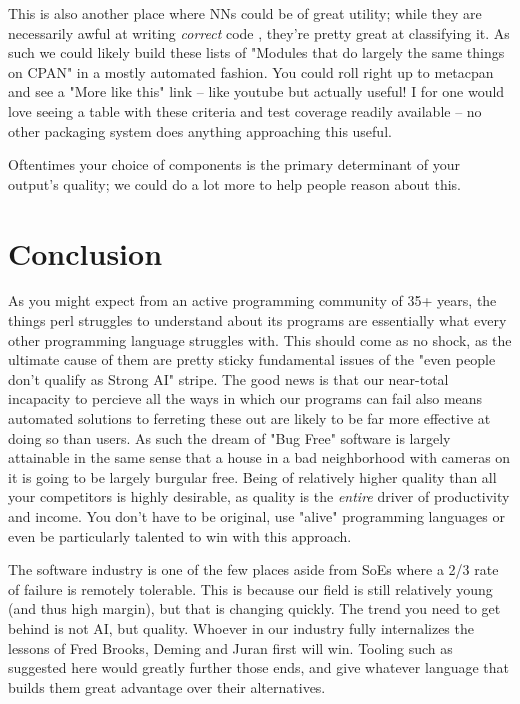 \documentclass{article}
\begin{document}
This is also another place where NNs could be of great utility; while they are necessarily awful at writing \textit{correct} code \cite{copilot}, they're pretty great at classifying it.
As such we could likely build these lists of "Modules that do largely the same things on CPAN" in a mostly automated fashion.
You could roll right up to metacpan and see a "More like this" link -- like youtube but actually useful!
I for one would love seeing a table with these criteria and test coverage readily available -- no other packaging system does anything approaching this useful.

Oftentimes your choice of components is the primary determinant of your output's quality; we could do a lot more to help people reason about this.

\newpage
\section{Conclusion}

As you might expect from an active programming community of 35+ years, the things perl struggles to understand about its programs are essentially what every other programming language struggles with.
This should come as no shock, as the ultimate cause of them are pretty sticky fundamental issues of the "even people don't qualify as Strong AI" stripe.
The good news is that our near-total incapacity to percieve all the ways in which our programs can fail also means automated solutions to ferreting these out are likely to be far more effective at doing so than users.
As such the dream of "Bug Free" software is largely attainable in the same sense that a house in a bad neighborhood with cameras on it is going to be largely burgular free.
Being of relatively higher quality than all your competitors is highly desirable, as quality is the \textit{entire} driver of productivity and income.
You don't have to be original, use "alive" programming languages or even be particularly talented to win with this approach.

The software industry is one of the few places aside from SoEs where a 2/3 rate of failure \cite{standish} is remotely tolerable.
This is because our field is still relatively young (and thus high margin), but that is changing quickly.
The trend you need to get behind is not AI, but quality.
Whoever in our industry fully internalizes the lessons of Fred Brooks, Deming and Juran first will win.
Tooling such as suggested here would greatly further those ends, and give whatever language that builds them great advantage over their alternatives.

\newpage


\end{document}
